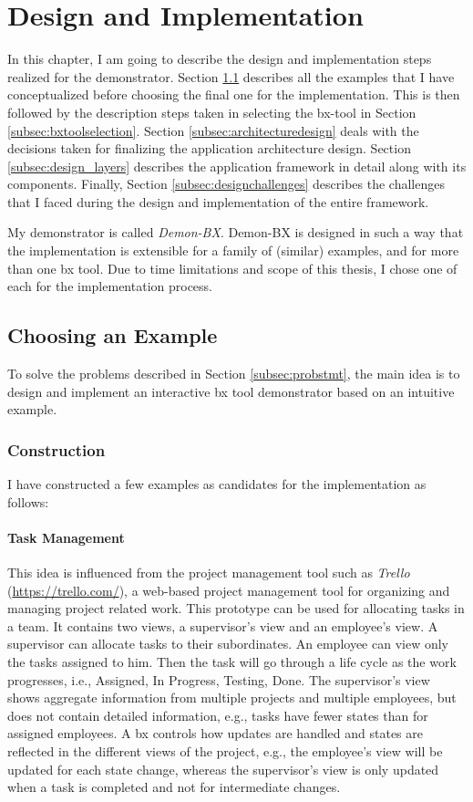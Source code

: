\section{Design and Implementation}\label{sec:design}
In this chapter, I am going to describe the design and implementation steps realized for the demonstrator. Section \ref{subsec:exampleforimplementation} describes all the examples that I have conceptualized before choosing the final one for the implementation. This is then followed by the description steps taken in selecting the bx-tool in Section \ref{subsec:bxtoolselection}. Section \ref{subsec:architecturedesign} deals with the decisions taken for finalizing the application architecture design. Section \ref{subsec:design_layers} describes the application framework in detail along with its components. Finally, Section \ref{subsec:designchallenges} describes the challenges that I faced during the design and implementation of the entire framework. 

My demonstrator is called \textit{\ac{Demon-BX}}. Demon-BX is designed in such a way that the implementation is extensible for a family of (similar) examples, and for more than one bx tool. Due to time limitations and scope of this thesis, I chose one of each for the implementation process.

\subsection{Choosing an Example}\label{subsec:exampleforimplementation}
To solve the problems described in Section \ref{subsec:probstmt}, the main idea is to design and implement an interactive bx tool demonstrator based on an intuitive example.

\subsubsection{Construction}\label{subsubsec:exampleconstruction}
I have constructed a few examples as candidates for the implementation as follows:

\paragraph{Task Management} This idea is influenced from the project management tool such as \textit{Trello} (\url{https://trello.com/}), a web-based project management tool for organizing and managing project related work. This prototype can be used for allocating tasks in a team. It contains two views, a supervisor's view and an employee's view. A supervisor can allocate tasks to their subordinates. An employee can view only the tasks assigned to him. Then the task will go through a life cycle as the work progresses, i.e., Assigned, In Progress, Testing, Done. The supervisor's view shows aggregate information from multiple projects and multiple employees, but does not contain detailed information, e.g., tasks have fewer states than for assigned employees. A bx controls how updates are handled and states are reflected in the different views of the project, e.g., the employee's view will be updated for each state change, whereas the supervisor's view is only updated when a task is completed and not for intermediate changes.

